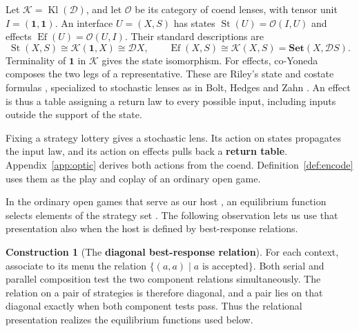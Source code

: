 \documentclass[11pt,a4paper]{article}
\theoremstyle{definition}
\newtheorem*{construction}{Construction}
\newcommand{\D}{\mathcal D}
\newcommand{\one}{\mathbf 1}
\newcommand{\Kl}{\operatorname{Kl}}
\newcommand{\Set}{\mathbf{Set}}
\newcommand{\Opt}{\mathcal O}
\newcommand{\St}{\operatorname{St}}
\newcommand{\Ef}{\operatorname{Ef}}
\begin{document}
Let $\mathcal K=\Kl(\D)$, and let $\Opt$ be its category of coend lenses, with tensor unit $I=(\one,\one)$. An interface $U=(X,S)$ has states $\St(U)=\Opt(I,U)$ and effects $\Ef(U)=\Opt(U,I)$. Their standard descriptions are
\begin{equation}
    \St(X,S)\cong\mathcal K(\one,X)\cong\D X,\qquad
    \Ef(X,S)\cong\mathcal K(X,S)=\Set(X,\D S).
    \label{eq:state-effect}
\end{equation}
Terminality of $\one$ in $\mathcal K$ gives the state isomorphism. For effects, co-Yoneda composes the two legs of a representative. These are Riley's state and costate formulas \cite[Propositions~2.0.6--2.0.7]{riley}, specialized to stochastic lenses as in Bolt, Hedges and Zahn \cite[Lemmas~3.5.1 and~3.12.1]{bolt}. An effect is thus a table assigning a return law to every possible input, including inputs outside the support of the state.

Fixing a strategy lottery gives a stochastic lens. Its action on states propagates the input law, and its action on effects pulls back a \textbf{return table}. Appendix~\ref{app:optic} derives both actions from the coend. Definition~\ref{def:encode} uses them as the play and coplay of an ordinary open game.

In the ordinary open games that serve as our host \cite{pure}, an equilibrium function selects elements of the strategy set \cite[Definition~1 and Theorem~2]{gklf}. The following observation lets us use that presentation also when the host is defined by best-response relations.

\begin{construction}[The \textbf{diagonal best-response relation}]
    For each context, associate to its menu the relation $\{(a,a)\mid a\text{ is accepted}\}$. Both serial and parallel composition test the two component relations simultaneously. The relation on a pair of strategies is therefore diagonal, and a pair lies on that diagonal exactly when both component tests pass. Thus the relational presentation realizes the equilibrium functions used below.
\end{construction}
\end{document}
